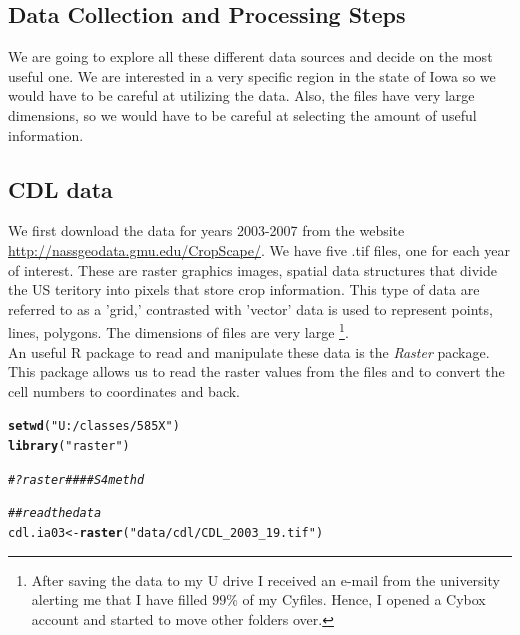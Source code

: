 \documentclass{article}\usepackage[]{graphicx}\usepackage[]{color}
\makeatletter
\newcommand{\hlstr}[1]{\textcolor[rgb]{0.192,0.494,0.8}{#1}}%
\newcommand{\hlcom}[1]{\textcolor[rgb]{0.678,0.584,0.686}{\textit{#1}}}%
\newcommand{\hlstd}[1]{\textcolor[rgb]{0.345,0.345,0.345}{#1}}%
\newcommand{\hlkwb}[1]{\textcolor[rgb]{0.69,0.353,0.396}{#1}}%
\newcommand{\hlkwd}[1]{\textcolor[rgb]{0.737,0.353,0.396}{\textbf{#1}}}%
\newenvironment{kframe}{%
 \def\at@end@of@kframe{}%
 \ifinner\ifhmode%
  \def\at@end@of@kframe{\end{minipage}}%
  \begin{minipage}{\columnwidth}%
 \fi\fi%
 \def\FrameCommand##1{\hskip\@totalleftmargin \hskip-\fboxsep
 \colorbox{shadecolor}{##1}\hskip-\fboxsep
     \hskip-\linewidth \hskip-\@totalleftmargin \hskip\columnwidth}%
 \MakeFramed {\advance\hsize-\width
   \@totalleftmargin\z@ \linewidth\hsize
   \@setminipage}}%
 {\par\unskip\endMakeFramed%
 \at@end@of@kframe}
\newenvironment{knitrout}{}{} %
\makeatother
\begin{document}
\begin{itemize}
\section{Data Collection and Processing Steps}

We are going to explore all these different data sources and decide on the most useful one. We are interested in a very specific region in the state of Iowa so we would have to be careful at utilizing the data. Also, the files have very large dimensions, so we would have to be careful at selecting the amount of useful information.

\subsection{CDL data}

We first download the data for years 2003-2007 from the website \href {CDL} {http://nassgeodata.gmu.edu/CropScape/}. We have five .tif files, one for each year of interest. These are raster graphics images, spatial data structures that divide the US teritory into pixels that store crop information. This type of data are referred to as a 'grid,' contrasted with 'vector' data is used to represent points, lines, polygons. The dimensions of files are very large \footnote{After saving the data to my U drive I received an e-mail from the university alerting me that I have filled $99\%$ of my Cyfiles. Hence, I opened a Cybox account and started to move other folders over.}.\\

An useful R package to read and manipulate these data is the \textit{Raster} package. This package allows us to read the raster values from the files and to convert the cell numbers to coordinates and back. \\

\begin{knitrout}
\color{fgcolor}\begin{kframe}
\begin{alltt}
\hlkwd{setwd}\hlstd{(}\hlstr{"U:/classes/585X"}\hlstd{)}
\hlkwd{library}\hlstd{(}\hlstr{"raster"}\hlstd{)}
\end{alltt}


{\ttfamily\noindent\itshape\color{messagecolor}{\#\# Loading required package: sp}}\begin{alltt}
\hlcom{# ?raster ####S4 methd}

\hlcom{## read the data}
\hlstd{cdl.ia03} \hlkwb{<-} \hlkwd{raster}\hlstd{(}\hlstr{"data/cdl/CDL_2003_19.tif"}\hlstd{)}
\end{alltt}



\end{kframe}
\end{knitrout}
\end{itemize}
\end{document}
